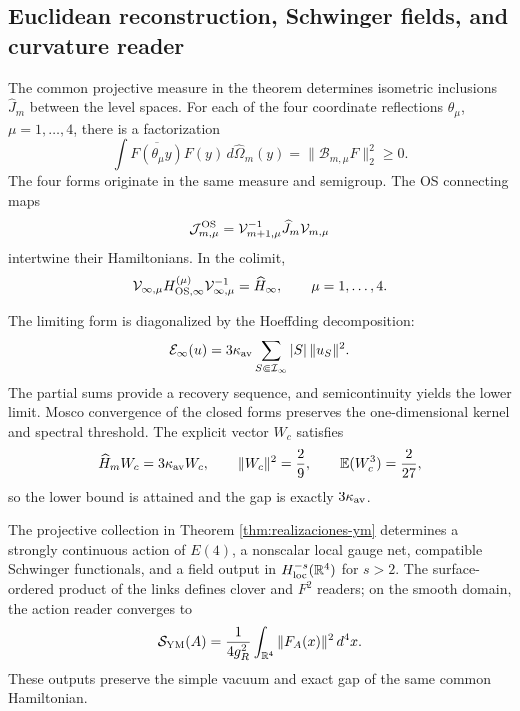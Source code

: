 \subsection*{Euclidean reconstruction, Schwinger fields, and curvature reader}

The common projective measure in the theorem determines isometric inclusions
\(\widehat J_m\) between the level spaces. For each of the four
coordinate reflections \(\theta_\mu\), \(\mu=1,\ldots,4\), there is a
factorization
\begin{equation}\label{eq:amp-ym-cuatro-os}
 \int\overline{F(\theta_\mu y)}F(y)\,
 d\widehat\Omega_m(y)
 =\|\mathcal B_{m,\mu}F\|_2^2\geq0.
\end{equation}
The four forms originate in the same measure and semigroup. The
OS connecting maps
\[
 \mathcal J_{m,\mu}^{\rm OS}
 =\mathcal V_{m+1,\mu}^{-1}\widehat J_m\mathcal V_{m,\mu}
\]
intertwine their Hamiltonians. In the colimit,
\begin{equation}\label{eq:amp-ym-hamiltoniano-comun}
 \mathcal V_{\infty,\mu}H_{{\rm OS},\infty}^{(\mu)}
 \mathcal V_{\infty,\mu}^{-1}
 =\widehat H_\infty,
 \qquad \mu=1,\ldots,4.
\end{equation}

The limiting form is diagonalized by the Hoeffding decomposition:
\begin{equation}\label{eq:amp-ym-forma-limite}
 \mathcal E_\infty(u)=3\kappa_{\rm av}
 \sum_{S\Subset\mathcal I_\infty}|S|\,\|u_S\|^2.
\end{equation}
The partial sums provide a recovery sequence, and
semicontinuity yields the lower limit. Mosco convergence of the
closed forms preserves the one-dimensional kernel and spectral threshold. The
explicit vector \(W_c\) satisfies
\begin{equation}\label{eq:amp-ym-testigo-gap}
 \widehat H_mW_c=3\kappa_{\rm av}W_c,
 \qquad \|W_c\|^2=\frac29,
 \qquad \mathbb E(W_c^3)=\frac2{27},
\end{equation}
so the lower bound is attained and the gap is exactly
\(3\kappa_{\rm av}\).

\begin{theorem}
\label{thm:amp-ym-terminacion}
The projective collection in Theorem \ref{thm:realizaciones-ym} determines a
strongly continuous action of \(E(4)\), a nonscalar local gauge net,
compatible Schwinger functionals, and a field output in
\(H^{-s}_{\rm loc}(\mathbb R^4)\) for \(s>2\). The surface-ordered
product of the links defines clover and \(F^2\) readers; on the smooth
domain, the action reader converges to
\begin{equation}\label{eq:amp-ym-f2}
 \mathcal S_{\rm YM}(A)
 =\frac1{4g_R^2}\int_{\mathbb R^4}\|F_A(x)\|^2\,d^4x.
\end{equation}
These outputs preserve the simple vacuum and exact gap of the same
common Hamiltonian.
\end{theorem}

